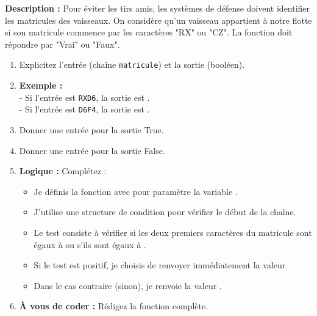 \begin{Exercise}[title={La fonction \texttt{est\_allie} (Simple) }]
\textbf{Description :} Pour éviter les tirs amis, les systèmes de défense doivent identifier les matricules des vaisseaux. On considère qu'un vaisseau appartient à notre flotte si son matricule commence par les caractères "RX" ou "CZ". La fonction doit répondre par "Vrai" ou "Faux".
\begin{enumerate}
    \item Explicitez l'entrée (chaîne \texttt{matricule}) et la sortie (booléen).
    \item \textbf{Exemple :} \\- Si l'entrée est \texttt{RXD6}, la sortie est \dotfill.\\
    - Si l'entrée est \texttt{D6F4}, la sortie est \dotfill.
    \item Donner une entrée pour la sortie True.
    \item Donner une entrée pour la sortie False.
    \item \textbf{Logique :} Complétez :
    \begin{itemize}
        \item Je définis la fonction \dotfill avec pour paramètre la variable \dotfill.
        \item J'utilise une structure de condition \dotfill pour vérifier le début de la chaîne.
        \item Le test consiste à vérifier si les deux premiers caractères du matricule sont égaux à \dotfill ou s'ils sont égaux à \dotfill.
        \item Si le test est positif, je choisis de renvoyer immédiatement la valeur \dotfill
        \item Dans le cas contraire (sinon), je renvoie la valeur \dotfill.
    \end{itemize}
    \item \textbf{À vous de coder :} Rédigez la fonction complète.
\end{enumerate}
\end{Exercise}

